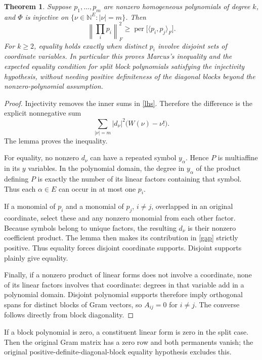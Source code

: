 \documentclass[11pt]{article}
\newcommand{\per}{\operatorname{per}}
\newcommand{\N}{\mathbb N}
\newtheorem{theorem}{Theorem}
\begin{document}
\begin{theorem}\label{nocollisions}
Suppose $p_1,\ldots,p_m$ are nonzero homogeneous polynomials of degree $k$,
and $\Phi$ is injective on $\{\nu\in\N^E:|\nu|=m\}$.
Then
\[
 \left\|\prod_i p_i\right\|_F^2
    \geq\per\bigl[\langle p_i,p_j\rangle_F\bigr].
\]
For $k\geq2$, equality holds exactly when distinct $p_i$ involve disjoint sets
of coordinate variables. In particular this proves Marcus's inequality and
the expected equality condition for split block polynomials satisfying the
injectivity hypothesis, without needing positive definiteness of the diagonal
blocks beyond the nonzero-polynomial assumption.
\end{theorem}
\begin{proof}
Injectivity removes the inner sums in \eqref{lhs}. Therefore the difference is
the explicit nonnegative sum
\begin{equation}\label{gap}
 \sum_{|\nu|=m}|d_\nu|^2\bigl(W(\nu)-\nu!\bigr).
\end{equation}
The lemma proves the inequality.

For equality, no nonzero $d_\nu$ can have a repeated symbol $y_\alpha$.
Hence $P$ is multiaffine in its $y$ variables. In the polynomial domain,
the degree in $y_\alpha$ of the product defining $P$ is exactly the number
of its linear factors containing that symbol. Thus each $\alpha\in E$ can
occur in at most one $p_i$.

If a monomial of $p_i$ and a monomial of $p_j$, $i\ne j$, overlapped in an
original coordinate, select these and any nonzero monomial from each other
factor. Because symbols belong to unique factors, the resulting $d_\nu$
is their nonzero coefficient product. The lemma then makes its contribution
in \eqref{gap} strictly positive. Thus equality forces disjoint coordinate
supports. Disjoint supports plainly give equality.

Finally, if a nonzero product of linear forms does not involve a coordinate,
none of its linear factors involves that coordinate: degrees in that variable
add in a polynomial domain. Disjoint polynomial supports therefore imply
orthogonal spans for distinct blocks of Gram vectors, so $A_{ij}=0$ for
$i\ne j$. The converse follows directly from block diagonality.
\end{proof}

If a block polynomial is zero, a constituent linear form is zero in the split
case. Then the original Gram matrix has a zero row and both permanents vanish;
the original positive-definite-diagonal-block equality hypothesis excludes this.
\end{document}
